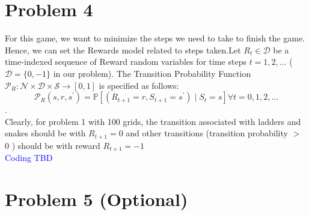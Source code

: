 \documentclass{article}
\begin{document}
\section*{Problem 4}
\hspace*{1em} For this game, we want to minimize the steps we need to take to finish the game. Hence, we can set the Rewards model related to steps taken.Let $R_{t}\in \mathcal{D}$ be a time-indexed sequence of Reward random variables for time steps $t=1,2, \ldots$ ($\mathcal{D}=\{0,-1\}$ in our problem). The Transition Probability Function $\mathcal{P}_{R}: \mathcal{N} \times \mathcal{D} \times \mathcal{S} \rightarrow[0,1]$
 is specified as follows:\\ $$\mathcal{P}_{R}\left(s, r, s^{\prime}\right)=\mathbb{P}\left[\left(R_{t+1}=r, S_{t+1}=s^{\prime}\right) \mid S_{t}=s\right] \forall t=0,1,2, \ldots$$.\\
Clearly, for problem 1 with 100 grids, the transition associated with ladders and snakes should be with $R_{t+1} = 0$ and other transitions (transition probability $>$ 0 ) should be with reward $R_{t+1} = -1$\\
\textcolor{blue}{Coding TBD}
\section*{Problem 5 (Optional)}
\end{document}
